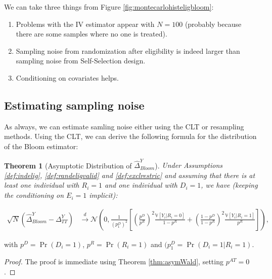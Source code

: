 \documentclass[
]{book}
\providecommand{\tightlist}{%
  \setlength{\itemsep}{0pt}\setlength{\parskip}{0pt}}
\newcommand{\var}[1]{\mathbb{V}[ #1 ]}
\newtheorem{theorem}{Theorem}[chapter]
\theoremstyle{definition}
\theoremstyle{definition}
\theoremstyle{definition}
\theoremstyle{definition}
\theoremstyle{remark}
\begin{document}
We can take three things from Figure \ref{fig:montecarlohisteligbloom}:

\begin{enumerate}
\def\labelenumi{\arabic{enumi}.}
\tightlist
\item
  Problems with the IV estimator appear with \(N=100\) (probably because there are some samples where no one is treated).
\item
  Sampling noise from randomization after eligibility is indeed larger than sampling noise from Self-Selection design.
\item
  Conditioning on covariates helps.
\end{enumerate}

\hypertarget{estimating-sampling-noise-2}{%
\subsection{Estimating sampling noise}\label{estimating-sampling-noise-2}}

As always, we can estimate samling noise either using the CLT or resampling methods.
Using the CLT, we can derive the following formula for the distribution of the Bloom estimator:

\begin{theorem}[Asymptotic Distribution of $\hat{\Delta}^Y_{Bloom}$]
\protect\hypertarget{thm:asymBloom}{}{\label{thm:asymBloom} \iffalse (Asymptotic Distribution of \(\hat{\Delta}^Y_{Bloom}\)) \fi{} }Under Assumptions \ref{def:indelig}, \ref{def:randeligvalid} and \ref{def:exclrestric} and assuming that there is at least one individual with \(R_i=1\) and one individual with \(D_i=1\), we have (keeping the conditioning on \(E_i=1\) implicit):

\begin{align*}
  \sqrt{N}(\hat{\Delta}^Y_{Bloom}-\Delta^Y_{TT}) &  \stackrel{d}{\rightarrow}
  \mathcal{N}\left(0,\frac{1}{(p^{D}_1)^2}\left[\left(\frac{p^D}{p^R}\right)^2\frac{\var{Y_i|R_i=0}}{1-p^R}+\left(\frac{1-p^D}{1-p^R}\right)^2\frac{\var{Y_i|R_i=1}}{p^R}\right]\right),
\end{align*}
\end{theorem}

with \(p^D=\Pr(D_i=1)\), \(p^R=\Pr(R_i=1)\) and \((p^{D}_1=\Pr(D_i=1|R_i=1)\).

\begin{proof}
\iffalse{} {Proof. } \fi{}The proof is immediate using Theorem \ref{thm:asymWald}, setting \(p^{AT}=0\).
\end{proof}
\end{document}
